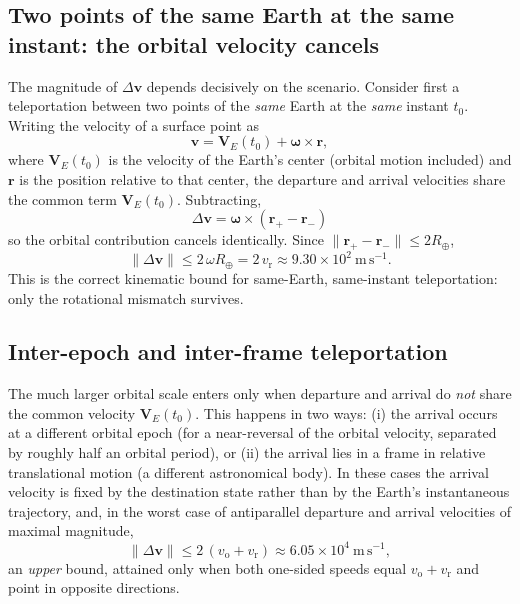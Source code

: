 \documentclass[11pt]{article}
\begin{document}
	\subsection{Two points of the same Earth at the same instant: the
		orbital velocity cancels}
	
	The magnitude of $\Delta\mathbf v$ depends decisively on the scenario.
	Consider first a teleportation between two points of the \emph{same}
	Earth at the \emph{same} instant $t_0$. Writing the velocity of a
	surface point as
	\begin{equation}
		\mathbf v=\mathbf V_{E}(t_0)+\boldsymbol\omega\times\mathbf r,
		\label{eq:surfacevel}
	\end{equation}
	where $\mathbf V_{E}(t_0)$ is the velocity of the Earth's center
	(orbital motion included) and $\mathbf r$ is the position relative to
	that center, the departure and arrival velocities share the common term
	$\mathbf V_{E}(t_0)$. Subtracting,
	\begin{equation}
		\boxed{\;\Delta\mathbf v=\boldsymbol\omega\times
			(\mathbf r_{+}-\mathbf r_{-})\;}
		\label{eq:cancel}
	\end{equation}
	so the orbital contribution cancels identically. Since
	$\|\mathbf r_{+}-\mathbf r_{-}\|\le 2R_{\oplus}$,
	\begin{equation}
		\|\Delta\mathbf v\|\le 2\,\omega R_{\oplus}
		=2\,v_{\mathrm r}\approx 9.30\times10^{2}\ \mathrm{m\,s^{-1}}.
		\label{eq:samebound}
	\end{equation}
	This is the correct kinematic bound for same-Earth, same-instant
	teleportation: only the rotational mismatch survives.
	
	\subsection{Inter-epoch and inter-frame teleportation}
	
	The much larger orbital scale enters only when departure and arrival do
	\emph{not} share the common velocity $\mathbf V_{E}(t_0)$. This happens
	in two ways: (i) the arrival occurs at a different orbital epoch (for a
	near-reversal of the orbital velocity, separated by roughly half an
	orbital period), or (ii) the arrival lies in a frame in relative
	translational motion (a different astronomical body). In these cases the
	arrival velocity is fixed by the destination state rather than by the
	Earth's instantaneous trajectory, and, in the worst case of antiparallel
	departure and arrival velocities of maximal magnitude,
	\begin{equation}
		\|\Delta\mathbf v\|\le 2\,(v_{\mathrm o}+v_{\mathrm r})
		\approx 6.05\times10^{4}\ \mathrm{m\,s^{-1}},
		\label{eq:interbound}
	\end{equation}
	an \emph{upper} bound, attained only when both one-sided speeds equal
	$v_{\mathrm o}+v_{\mathrm r}$ and point in opposite directions.
	
\end{document}
